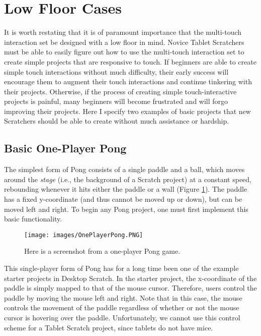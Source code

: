 \section{Low Floor Cases}
It is worth restating that it is of paramount importance that the multi-touch interaction set be designed with a low floor in mind. Novice Tablet Scratchers must be able to easily figure out how to use the multi-touch interaction set to create simple projects that are responsive to touch. If beginners are able to create simple touch interactions without much difficulty, their early success will encourage them to augment their touch interactions and continue tinkering with their projects. Otherwise, if the process of creating simple touch-interactive projects is painful, many beginners will become frustrated and will forgo improving their projects. Here I specify two examples of basic projects that new Scratchers should be able to create without much assistance or hardship.

\subsection{Basic One-Player Pong}
The simplest form of Pong consists of a single paddle and a ball, which moves around the \emph{stage} (i.e., the background of a Scratch project) at a constant speed, rebounding whenever it hits either the paddle or a wall (Figure \ref{OnePlayerPong}). The paddle has a fixed y-coordinate (and thus cannot be moved up or down), but can be moved left and right. To begin any Pong project, one must first implement this basic functionality.

\begin{figure}
\centering
\texttt{[image: images/OnePlayerPong.PNG]}
\caption[One-Player Pong Screenshot]
{Here is a screenshot from a one-player Pong game.}
\label{OnePlayerPong}
\end{figure}

This single-player form of Pong has for a long time been one of the example starter projects in Desktop Scratch. In the starter project, the x-coordinate of the paddle is simply mapped to that of the mouse cursor. Therefore, users control the paddle by moving the mouse left and right. Note that in this case, the mouse controls the movement of the paddle regardless of whether or not the mouse cursor is hovering over the paddle. Unfortunately, we cannot use this control scheme for a Tablet Scratch project, since tablets do not have mice.

